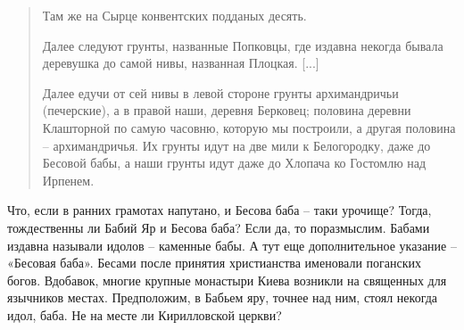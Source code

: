 




\begin{quotation}
Там же на Сырце конвентских подданых десять.

Далее следуют грунты, названные Попковцы, где издавна некогда бывала деревушка до самой нивы, названная Плоцкая. [...]

Далее едучи от сей нивы в левой стороне грунты архимандричьи (печерские), а в правой наши, деревня Берковец; половина деревни Клашторной по самую часовню, которую мы построили, а другая половина – архимандричья. Их грунты идут на две мили к Белогородку, даже до Бесовой бабы, а наши грунты идут даже до Хлопача ко Гостомлю над Ирпенем.
\end{quotation}

Что, если в ранних грамотах напутано, и Бесова баба – таки урочище? Тогда, тождественны ли Бабий Яр и Бесова баба? Если да, то поразмыслим. Бабами издавна называли идолов – каменные бабы. А тут еще дополнительное указание – «Бесовая баба». Бесами после принятия христианства именовали поганских богов. Вдобавок, многие крупные монастыри Киева возникли на священных для язычников местах. Предположим, в Бабьем яру, точнее над ним, стоял некогда идол, баба. Не на месте ли Кирилловской церкви?

